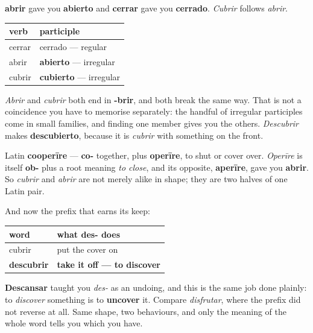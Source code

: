 \begin{grammarlens}[title={Grammar Lens: a third irregular participle}]
\textbf{abrir} gave you \textbf{abierto} and \textbf{cerrar} gave you \textbf{cerrado}. \emph{Cubrir} follows \emph{abrir}.

\noindent
\begin{tabularx}{\linewidth}{@{}>{\raggedright\arraybackslash}X>{\raggedright\arraybackslash}X@{}}
\toprule
\textbf{verb} & \textbf{participle} \\
\midrule
cerrar & cerrado — regular \\
abrir & \textbf{abierto} — irregular \\
cubrir & \textbf{cubierto} — irregular \\
\bottomrule
\end{tabularx}

\emph{Abrir} and \emph{cubrir} both end in \textbf{-brir}, and both break the same way. That is not a coincidence you have to memorise separately: the handful of irregular participles come in small families, and finding one member gives you the others. \emph{Descubrir} makes \textbf{descubierto}, because it is \emph{cubrir} with something on the front.
\end{grammarlens}

\begin{cousinweb}
Latin \textbf{cooperīre} — \textbf{co-} together, plus \textbf{operīre}, to shut or cover over. \emph{Operīre} is itself \textbf{ob-} plus a root meaning \emph{to close}, and its opposite, \textbf{aperīre}, gave you \textbf{abrir}. So \emph{cubrir} and \emph{abrir} are not merely alike in shape; they are two halves of one Latin pair.

And now the prefix that earns its keep:

\noindent
\begin{tabularx}{\linewidth}{@{}>{\raggedright\arraybackslash}X>{\raggedright\arraybackslash}X@{}}
\toprule
\textbf{word} & \textbf{what des- does} \\
\midrule
cubrir & put the cover on \\
\textbf{descubrir} & \textbf{take it off — to discover} \\
\bottomrule
\end{tabularx}

\textbf{Descansar} taught you \emph{des-} as an undoing, and this is the same job done plainly: to \emph{discover} something is to \textbf{uncover} it. Compare \emph{disfrutar}, where the prefix did not reverse at all. Same shape, two behaviours, and only the meaning of the whole word tells you which you have.
\end{cousinweb}

